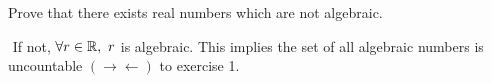 Prove that there exists real numbers which are not algebraic.

\begin{tcolorbox}
	\begin{solution}$ $ 
		If not, $\forall r \in \mathbb{R},~ r$ is algebraic. This implies the set of all algebraic numbers is uncountable $(\rightarrow\leftarrow)$ to exercise 1.
	\end{solution}
\end{tcolorbox}